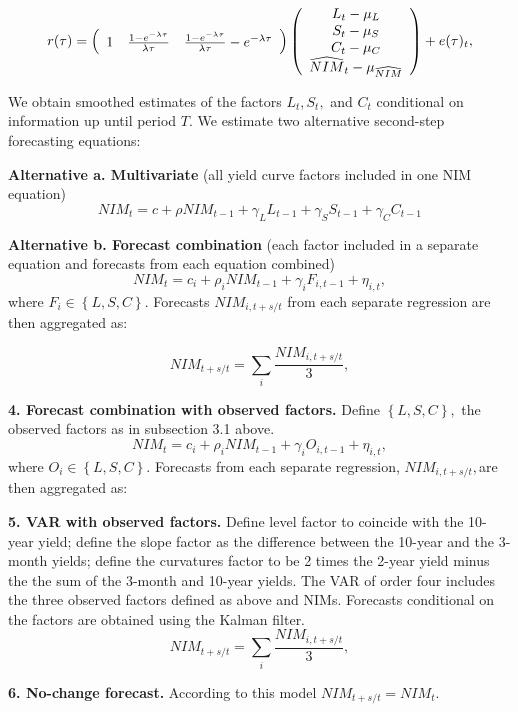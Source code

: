 \documentclass[11pt]{article}
\begin{document}
\[
r(\tau )=\left(
\begin{array}{ccc}
1 & \frac{1-e^{-\lambda \tau }}{\lambda \tau } & \frac{1-e^{-\lambda \tau }}{%
\lambda \tau }-e^{-\lambda \tau }%
\end{array}%
\right) \left(
\begin{array}{c}
{L_{t}-\mu _{L}} \\
{S_{t}-\mu _{S}} \\
{C_{t}-\mu _{C}} \\
\widehat{NIM}_{t}-\mu _{\widehat{NIM}}%
\end{array}%
\right) +e(\tau )_{t},
\]

We obtain smoothed estimates of the factors $L_{t},S_{t},$ and $C_{t}$ conditional on information up until period $T.$ We estimate two alternative second-step forecasting equations:

\noindent \textbf{Alternative a. Multivariate} (all yield curve factors included in one NIM equation)
\[
NIM_{t}=c+\rho NIM_{t-1}+\gamma _{L}L_{t-1}+\gamma _{S}S_{t-1}+\gamma
_{C}C_{t-1}
\]

\noindent \textbf{Alternative b. Forecast combination} (each factor included in a separate equation and forecasts from each equation combined)
\[
NIM_{t}=c_{i}+\rho _{i}NIM_{t-1}+\gamma _{i}F_{i,t-1}+{\eta _{i,t},}
\]%
where $F_{i}\in \left\{ L,S,C\right\} .$ Forecasts $NIM_{i,t+s/t}$ from each separate regression are then aggregated as:

\[
NIM_{t+s/t}=\sum_{i}\frac{NIM_{i,t+s/t}}{3},
\]

\noindent \textbf{4. Forecast combination with observed factors.} Define $\left\{L,S,C \right\} ,$ the observed factors as in subsection 3.1 above.
\[
NIM_{t}=c_{i}+\rho _{i}NIM_{t-1}+\gamma _{i}O_{i,t-1}+{\eta _{i,t},}
\]%
where $O_{i}\in \left\{ L,S,C\right\} .$ Forecasts  from each separate regression, $NIM_{i,t+s/t},$are then aggregated as:

\noindent \textbf{5. VAR with observed factors.} Define level factor to coincide with the 10-year yield; define the slope factor as the difference between the 10-year and the 3-month yields; define the curvatures factor to be 2 times the 2-year yield minus the the sum of the 3-month and 10-year yields. The VAR of order four includes the three observed factors defined as above and NIMs. Forecasts conditional on the factors are obtained using the Kalman filter.
\[
NIM_{t+s/t}=\sum_{i}\frac{NIM_{i,t+s/t}}{3},
\]

\noindent \textbf{6. No-change forecast.} According to this model $NIM_{t+s/t}=NIM_{t}${\normalsize . }
\end{document}
